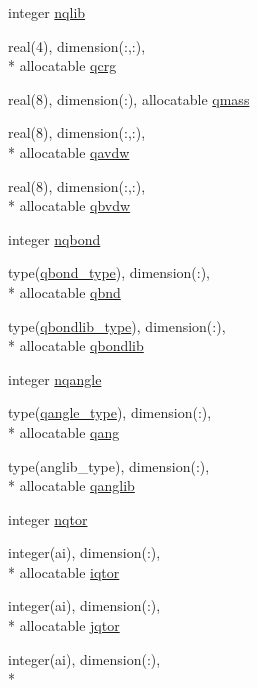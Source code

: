 \begin{DoxyCompactItemize}
integer \hyperlink{classqatom_a89b0c646995581a2d8b5579f3f013795}{nqlib}
\item 
real(4), dimension(\-:,\-:), \\*
allocatable \hyperlink{classqatom_a64f11bcf0290f6852b578ee62ace7a5e}{qcrg}
\item 
real(8), dimension(\-:), allocatable \hyperlink{classqatom_a501fb9488ebd37b0d1b650f9a72fd58e}{qmass}
\item 
real(8), dimension(\-:,\-:), \\*
allocatable \hyperlink{classqatom_ac9881de6ce1fc95c2451db03f280b3fc}{qavdw}
\item 
real(8), dimension(\-:,\-:), \\*
allocatable \hyperlink{classqatom_a2a1d93acc56540aa6051e266e8cacacd}{qbvdw}
\item 
integer \hyperlink{classqatom_a25a6842fa30f963e66849606eed652c7}{nqbond}
\item 
type(\hyperlink{structqatom_1_1qbond__type}{qbond\-\_\-type}), dimension(\-:), \\*
allocatable \hyperlink{classqatom_ac7698e27cffcd0d73aa5d9f2d63be5df}{qbnd}
\item 
type(\hyperlink{structqatom_1_1qbondlib__type}{qbondlib\-\_\-type}), dimension(\-:), \\*
allocatable \hyperlink{classqatom_a196079879269f180af8f7182248bbeaa}{qbondlib}
\item 
integer \hyperlink{classqatom_acb4dee7d6a9679f6b90735784ead412a}{nqangle}
\item 
type(\hyperlink{structqatom_1_1qangle__type}{qangle\-\_\-type}), dimension(\-:), \\*
allocatable \hyperlink{classqatom_ac67c4e289c7027f5966b90f8c449cc7c}{qang}
\item 
type(anglib\-\_\-type), dimension(\-:), \\*
allocatable \hyperlink{classqatom_a9a304992d62b752bdc4ea9e236e9d496}{qanglib}
\item 
integer \hyperlink{classqatom_acaadc57dc029a20be016f75b558883e1}{nqtor}
\item 
integer(ai), dimension(\-:), \\*
allocatable \hyperlink{classqatom_ae7a6c8483c92e6ee4a12477a427bb9f9}{iqtor}
\item 
integer(ai), dimension(\-:), \\*
allocatable \hyperlink{classqatom_af6de1185567eec0f9322e4d6430a2d96}{jqtor}
\item 
integer(ai), dimension(\-:), \\*

\end{DoxyCompactItemize}
